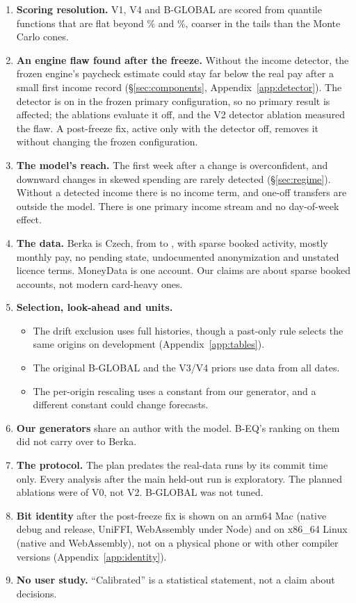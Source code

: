 \begin{enumerate}[label=\arabic*.]
  differ (\S\ref{sec:reversal}).
\item \textbf{Scoring resolution.} V1, V4 and B-GLOBAL are scored from
  quantile functions that are flat beyond \% and \%,
  coarser in the tails than the Monte Carlo cones.
\item \textbf{An engine flaw found after the freeze.} Without the income
  detector, the frozen engine's paycheck estimate could stay far below the
  real pay after a small first income record (\S\ref{sec:components},
  Appendix~\ref{app:detector}). The detector is on in the frozen primary
  configuration, so no primary result is affected; the ablations evaluate
  it off, and the V2 detector ablation measured the flaw. A post-freeze fix, active only with the
  detector off, removes it without changing the frozen configuration.
\item \textbf{The model's reach.} The first week after a change is
  overconfident, and downward changes in skewed spending are rarely
  detected (\S\ref{sec:regime}). Without a detected income there is no
  income term, and one-off transfers are outside the model. There is one
  primary income stream and no day-of-week effect.
\item \textbf{The data.} Berka is Czech, from  to
  , with sparse booked activity, mostly monthly pay, no
  pending state, undocumented anonymization and unstated licence terms.
  MoneyData is one account. Our claims are about sparse booked accounts,
  not modern card-heavy ones.
\item \textbf{Selection, look-ahead and units.}
  \begin{itemize}
  \item The drift exclusion uses full histories, though a past-only rule
    selects the same origins on development (Appendix~\ref{app:tables}).
  \item The original B-GLOBAL and the V3/V4 priors use data from all
    dates.
  \item The per-origin rescaling uses a constant from our generator, and
    a different constant could change forecasts.
  \end{itemize}
\item \textbf{Our generators} share an author with the model. B-EQ's
  ranking on them did not carry over to Berka.
\item \textbf{The protocol.} The plan predates the real-data runs by its
  commit time only. Every analysis after the main held-out run is
  exploratory. The planned ablations were of V0, not V2. B-GLOBAL was not
  tuned.
\item \textbf{Bit identity} after the post-freeze fix is shown on an
  arm64 Mac (native debug and release, UniFFI, WebAssembly under Node) and
  on x86\_64 Linux (native and WebAssembly), not on a physical phone or
  with other compiler versions (Appendix~\ref{app:identity}).
\item \textbf{No user study.} ``Calibrated'' is a statistical statement,
  not a claim about decisions.
\end{enumerate}
